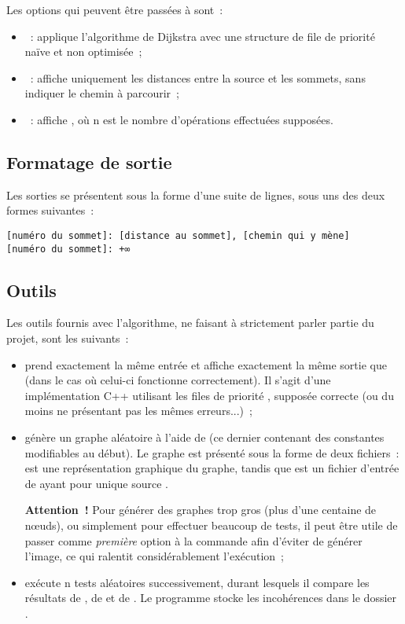 \documentclass[12p0t,a4paper]{article}
\begin{document}
Les options qui peuvent être passées à  sont~:
\begin{itemize}
\item {}~: applique l'algorithme de Dijkstra avec une structure de file de priorité naïve et non optimisée~;
\item {}~: affiche uniquement les distances entre la source et les sommets, sans indiquer le chemin à parcourir~;
\item {}~: affiche , où n est le nombre d'opérations effectuées supposées.
\end{itemize}

\subsection{Formatage de sortie}

Les sorties se présentent sous la forme d'une suite de lignes, sous uns des deux formes suivantes~:
\begin{lstlisting}
[numéro du sommet]: [distance au sommet], [chemin qui y mène]
[numéro du sommet]: +∞
\end{lstlisting}

\subsection{Outils}

Les outils fournis avec l'algorithme, ne faisant à strictement parler partie du projet, sont les suivants~:

\begin{itemize}
\item {} prend exactement la même entrée et affiche exactement la même sortie que  (dans le cas où celui-ci fonctionne correctement). Il s'agit d'une implémentation C++ utilisant les files de priorité , supposée correcte (ou du moins ne présentant pas les mêmes erreurs...)~;
\item {} génère un graphe aléatoire à l'aide de  (ce dernier contenant des constantes modifiables au début). Le graphe est présenté sous la forme de deux fichiers~:  est une représentation graphique du graphe, tandis que  est un fichier d'entrée de  ayant pour unique source .

\textbf{Attention~!} Pour générer des graphes trop gros (plus d'une centaine de nœuds), ou simplement pour effectuer beaucoup de tests, il peut être utile de passer  comme \emph{première} option à la commande afin d'éviter de générer l'image, ce qui ralentit considérablement l'exécution~;
\item {} exécute n tests aléatoires successivement, durant lesquels il compare les résultats de , de  et de . Le programme stocke les incohérences dans le dossier .
\end{itemize}
\end{document}
